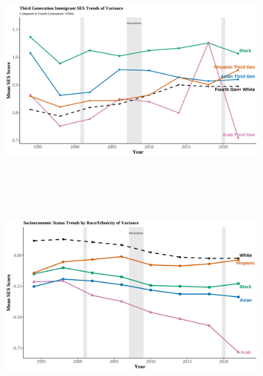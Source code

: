\clearpage

\begin{center}
    \begin{figure}[H]
    \caption{}
    \includegraphics[width=\textwidth, height=9cm]{figure/10-var-SES-thirdgens.png} 
    \label{fig:diag}
    \caption*{\footnotesize{}}
    \end{figure}
    \hfill%
\end{center}

\clearpage

\begin{center}
    \begin{figure}[H]
    \caption{}
    \includegraphics[width=\textwidth, height=9cm]{figure/11-var-SES-selfreport-race-ethn.png} 
    \label{fig:diag}
    \caption*{\footnotesize{}}
    \end{figure}
    \hfill%
\end{center}

\clearpage

% 

\newpage



